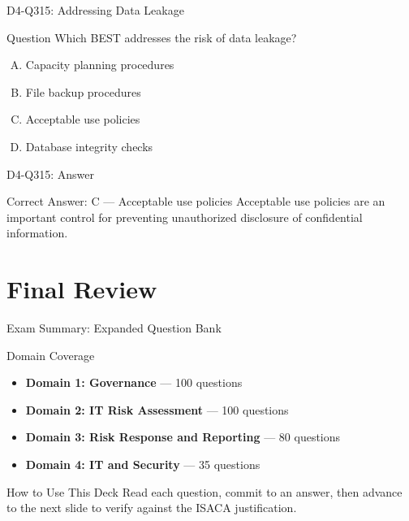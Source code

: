 \documentclass{beamer}
\begin{document}
	\begin{frame}{D4-Q315: Addressing Data Leakage}
		\begin{block}{Question}
			Which BEST addresses the risk of data leakage?
		\end{block}
		\begin{enumerate}[(A)]
			\item Capacity planning procedures
			\item File backup procedures
			\item Acceptable use policies
			\item Database integrity checks
		\end{enumerate}
	\end{frame}
	\begin{frame}{D4-Q315: Answer}
		\begin{block}{Correct Answer: C --- Acceptable use policies}
			Acceptable use policies are an important control for preventing unauthorized disclosure of confidential information.
		\end{block}
	\end{frame}
	
	\section{Final Review}
	
	\begin{frame}{Exam Summary: Expanded Question Bank}
		\begin{block}{Domain Coverage}
			\begin{itemize}
				\item \textbf{Domain 1: Governance} --- 100 questions
				\item \textbf{Domain 2: IT Risk Assessment} --- 100 questions
				\item \textbf{Domain 3: Risk Response and Reporting} --- 80 questions
				\item \textbf{Domain 4: IT and Security} --- 35 questions
			\end{itemize}
		\end{block}
		\begin{exampleblock}{How to Use This Deck}
			Read each question, commit to an answer, then advance to the next slide to verify against the ISACA justification.
		\end{exampleblock}
	\end{frame}
	
\end{document}
